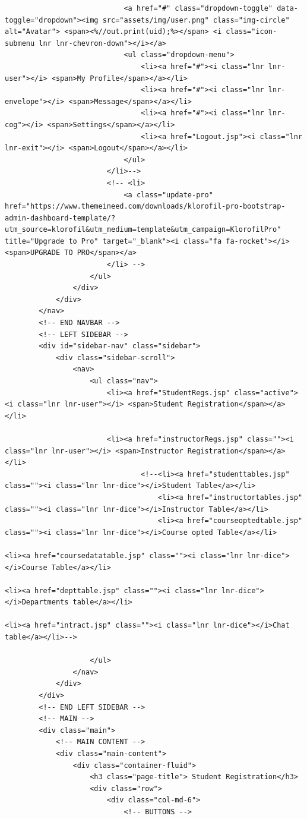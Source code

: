 \begin{lstlisting}
							<a href="#" class="dropdown-toggle" data-toggle="dropdown"><img src="assets/img/user.png" class="img-circle" alt="Avatar"> <span><%//out.print(uid);%></span> <i class="icon-submenu lnr lnr-chevron-down"></i></a>
							<ul class="dropdown-menu">
								<li><a href="#"><i class="lnr lnr-user"></i> <span>My Profile</span></a></li>
								<li><a href="#"><i class="lnr lnr-envelope"></i> <span>Message</span></a></li>
								<li><a href="#"><i class="lnr lnr-cog"></i> <span>Settings</span></a></li>
								<li><a href="Logout.jsp"><i class="lnr lnr-exit"></i> <span>Logout</span></a></li>
							</ul>
						</li>-->
						<!-- <li>
							<a class="update-pro" href="https://www.themeineed.com/downloads/klorofil-pro-bootstrap-admin-dashboard-template/?utm_source=klorofil&utm_medium=template&utm_campaign=KlorofilPro" title="Upgrade to Pro" target="_blank"><i class="fa fa-rocket"></i> <span>UPGRADE TO PRO</span></a>
						</li> -->
					</ul>
				</div>
			</div>
		</nav>
		<!-- END NAVBAR -->
		<!-- LEFT SIDEBAR -->
		<div id="sidebar-nav" class="sidebar">
			<div class="sidebar-scroll">
				<nav>
					<ul class="nav">
						<li><a href="StudentRegs.jsp" class="active"><i class="lnr lnr-user"></i> <span>Student Registration</span></a></li>
					
						<li><a href="instructorRegs.jsp" class=""><i class="lnr lnr-user"></i> <span>Instructor Registration</span></a></li>
				                <!--<li><a href="studenttables.jsp" class=""><i class="lnr lnr-dice"></i>Student Table</a></li>
									<li><a href="instructortables.jsp" class=""><i class="lnr lnr-dice"></i>Instructor Table</a></li>
									<li><a href="courseoptedtable.jsp" class=""><i class="lnr lnr-dice"></i>Course opted Table</a></li>
                                                                        <li><a href="coursedatatable.jsp" class=""><i class="lnr lnr-dice"></i>Course Table</a></li>
                                                                        <li><a href="depttable.jsp" class=""><i class="lnr lnr-dice"></i>Departments table</a></li>
                                                                        <li><a href="intract.jsp" class=""><i class="lnr lnr-dice"></i>Chat table</a></li>-->
				
					</ul>
				</nav>
			</div>
		</div>
		<!-- END LEFT SIDEBAR -->
		<!-- MAIN -->
		<div class="main">
			<!-- MAIN CONTENT -->
			<div class="main-content">
				<div class="container-fluid">
					<h3 class="page-title"> Student Registration</h3>
					<div class="row">
						<div class="col-md-6">
							<!-- BUTTONS -->
							

\end{lstlisting}
